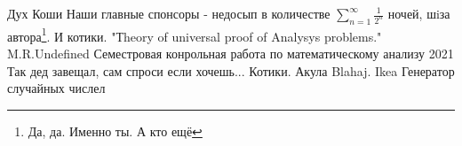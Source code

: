 \begin{thebibliography}{XXXX}
	 Дух Коши
	  Наши главные спонсоры - недосып в количестве $ \sum_{n=1}^{\infty} {\frac{1}{2^n}}$ ночей, шiза автора\footnote{Да, да. Именно ты. А кто ещё}. И котики.
	 "Тheory of universal proof of Analysys problems." M.R.Undefined
	 Семестровая конрольная работа по математическому анализу 2021
	 Так дед завещал, сам спроси если хочешь...
	 Котики. 
	 Акула Blahaj. Ikea
	 Генератор случайных числел
\end{thebibliography}
